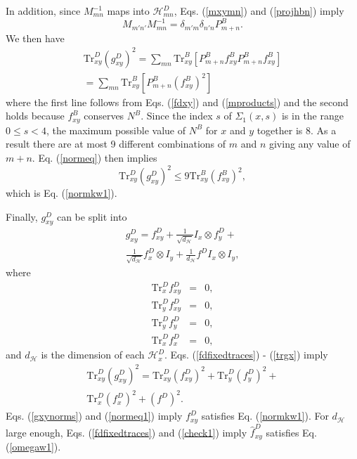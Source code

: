 \documentclass[12pt,amsmath,amssymb,onecolumn]{revtex4-2}
\begin{document}
In addition, since $M_{mn}^{-1}$ maps into $\mathcal{H}^D_{mn}$,
Eqs. (\ref{mxymn}) and (\ref{projhbn}) imply 
\begin{equation}
  \label{mproducts}
  M_{m'n'} M_{mn}^{-1} = \delta_{m'm} \delta_{n'n} P^B_{m + n}.
\end{equation}
We then have
\begin{multline}
  \label{normeq}
  \mathrm{Tr}^D_{xy} ( g^D_{xy})^2 = \sum_{mn} \mathrm{Tr}^B_{xy}[ P^B_{m +n} f^B_{xy}P^B_{m+n} f^B_{xy}] \\
  =  \sum_{mn} \mathrm{Tr}^B_{xy}[ P^B_{m +n} (f^B_{xy})^2]
\end{multline}
where the first line follows from Eqs. (\ref{fdxy}) and (\ref{mproducts})
and the second holds because $f^B_{xy}$ conserves $N^B$.
Since the index $s$ of $\Sigma_1(x,s)$ is in the range $0 \le s < 4$,
the maximum possible value of $N^B$ for $x$ and $y$ together is 8.
As a result 
there are at most 9 different combinations of $m$ and $n$
giving any value of $m + n$. Eq. (\ref{normeq}) then implies
\begin{equation}
  \label{normeq1}
    \mathrm{Tr}^D_{xy} ( g^D_{xy})^2 \le 9 \mathrm{Tr}^B_{xy}(f^B_{xy})^2,
\end{equation}
which is Eq. (\ref{normkw1}).

Finally, $g^D_{xy}$ can be split into
\begin{multline}
  \label{fdfixedtraces}
  g^D_{xy} = f^D_{xy} + \frac{1}{\sqrt{d_\mathcal{H}}} I_x \otimes f^D_y + \\
  \frac{1}{\sqrt{d_\mathcal{H}}} f^D_x  \otimes I_y + \frac{1}{d_\mathcal{H}} f^D I_x \otimes I_y,
\end{multline}
where
\begin{subequations}
  \begin{eqnarray}
    \label{trgxy0}
    \mathrm{Tr}^D_x f^D_{xy} & = & 0, \\
    \label{trgxy1}
    \mathrm{Tr}^D_y f^D_{xy} & = & 0, \\
    \label{trgy}
    \mathrm{Tr}^D_y f^D_y & = & 0, \\
    \label{trgx}
    \mathrm{Tr}^D_x f^D_x & = & 0,
  \end{eqnarray}
\end{subequations}
and $d_\mathcal{H}$ is the dimension of each $\mathcal{H}^D_x$.
Eqs. (\ref{fdfixedtraces}) - (\ref{trgx}) imply
\begin{multline}
  \label{gxynorms}
  \mathrm{Tr}^D_{xy}(g^D_{xy})^2 = \mathrm{Tr}^D_{xy}(f^D_{xy})^2 + \mathrm{Tr}^D_y(f^D_y)^2 +
  \\ \mathrm{Tr}^D_x(f^D_x)^2 + (f^D)^2.
\end{multline}
Eqs. (\ref{gxynorms}) and (\ref{normeq1}) imply $f^D_{xy}$ satisfies Eq. (\ref{normkw1}). For $d_\mathcal{H}$ large enough,
Eqs. (\ref{fdfixedtraces}) and (\ref{check1}) imply $\hat{f}^D_{xy}$ satisfies Eq. (\ref{omegaw1}).
\end{document}
